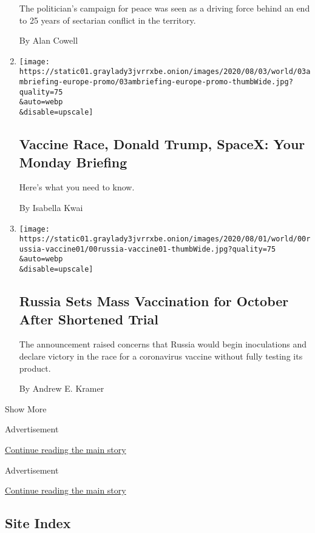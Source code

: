 \begin{enumerate}
  The politician's campaign for peace was seen as a driving force behind
  an end to 25 years of sectarian conflict in the territory.

  By Alan Cowell
\item
  \href{/2020/08/02/briefing/vaccine-race-donald-trump-spacex.html}{}

  \texttt{[image: https://static01.graylady3jvrrxbe.onion/images/2020/08/03/world/03ambriefing-europe-promo/03ambriefing-europe-promo-thumbWide.jpg?quality=75\\\&auto=webp\\\&disable=upscale]}

  \hypertarget{vaccine-race-donald-trump-spacex-your-monday-briefing}{%
  \subsection{Vaccine Race, Donald Trump, SpaceX: Your Monday
  Briefing}\label{vaccine-race-donald-trump-spacex-your-monday-briefing}}

  Here's what you need to know.

  By Isabella Kwai
\item
  \href{/2020/08/02/world/europe/russia-trials-vaccine-October.html}{}

  \texttt{[image: https://static01.graylady3jvrrxbe.onion/images/2020/08/01/world/00russia-vaccine01/00russia-vaccine01-thumbWide.jpg?quality=75\\\&auto=webp\\\&disable=upscale]}

  \hypertarget{russia-sets-mass-vaccination-for-october-after-shortened-trial}{%
  \subsection{Russia Sets Mass Vaccination for October After Shortened
  Trial}\label{russia-sets-mass-vaccination-for-october-after-shortened-trial}}

  The announcement raised concerns that Russia would begin inoculations
  and declare victory in the race for a coronavirus vaccine without
  fully testing its product.

  By Andrew E. Kramer
\end{enumerate}

Show More

Advertisement

\protect\hyperlink{after-mid1}{Continue reading the main story}

Advertisement

\protect\hyperlink{after-mktg}{Continue reading the main story}

\hypertarget{site-index}{%
\subsection{Site Index}\label{site-index}}

